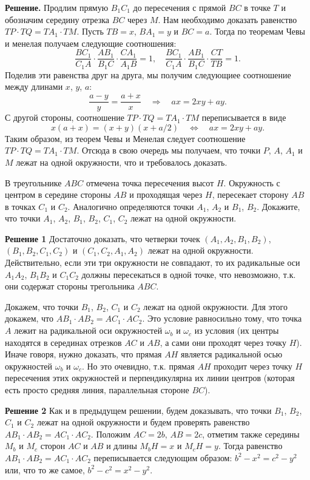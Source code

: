 \textbf{Решение.} Продлим прямую $B_1C_1$ до пересечения с прямой $BC$ в точке $T$ и обозначим середину отрезка $BC$ через $M$. Нам необходимо доказать равенство $TP\cdot TQ=TA_1\cdot TM$. Пусть $TB=x$, $BA_1=y$ и $BC=a$. Тогда по теоремам Чевы и менелая получаем следующие соотношения: $$\frac{BC_1}{C_1A}\cdot \frac{AB_1}{B_1C}\cdot\frac{CA_1}{A_1B}=1, \quad \frac{BC_1}{C_1A}\cdot\frac{AB_1}{B_1C}\cdot\frac{CT}{TB}=1.$$ Поделив эти равенства друг на друга, мы получим следующиее соотношение между длинами $x$, $y$, $a$: $$\frac{a-y}{y}=\frac{a+x}{x}\quad\Longrightarrow\quad ax=2xy+ay.$$ С другой стороны, соотношение $TP\cdot TQ=TA_1\cdot TM$ переписывается в виде $$x(a+x)=(x+y)(x+a/2)\quad\Longleftrightarrow\quad ax=2xy+ay.$$ Таким образом, из теорем Чевы и Менелая следует соотношение $TP\cdot TQ=TA_1\cdot TM$. Отсюда в свою очередь мы получаем, что точки $P$, $A$, $A_1$ и $M$ лежат на одной окружности, что и требовалось доказать.

 В треугольнике $ABC$ отмечена точка пересечения высот $H$. Окружность с центром в середине стороны $AB$ и проходящая через $H$, пересекает сторону $AB$ в точках $C_1$ и $C_2$. Аналогично определяются точки $A_1$, $A_2$ и $B_1$, $B_2$. Докажите, что точки $A_1$, $A_2$, $B_1$, $B_2$, $C_1$, $C_2$ лежат на одной окружности. 

\textbf{Решение 1} Достаточно доказать, что четверки точек $(A_1, A_2, B_1,B_2)$, $(B_1, B_2, C_1, C_2)$ и $(C_1, C_2, A_1,A_2)$ лежат на одной окружности. Действительно, если эти три окружности не совпадают, то их радикальные оси $A_1A_2$, $B_1B_2$ и $C_1C_2$ должны пересекаться в одной точке, что невозможно, т.к. они содержат стороны трегольника $ABC$.

Докажем, что точки $B_1$, $B_2$, $C_1$ и $C_2$ лежат на одной окружности. Для этого докажем, что $AB_1\cdot AB_2=AC_1\cdot AC_2$. Это условие равносильно тому, что точка $A$ лежит на радикальной оси окружностей $\omega_b$ и $\omega_c$ из условия (их центры находятся в серединах отрезков $AC$ и $AB$, а сами они проходят через точку $H$). Иначе говоря, нужно доказать, что прямая $AH$ является радикальной осью окружностей $\omega_b$ и $\omega_c$. Но это очевидно, т.к. прямая $AH$ проходит через точку $H$ пересечения этих окружностей и перпендикулярна их линии центров (которая есть просто средняя линия, параллельная стороне $BC$). 

\textbf{Решение 2} Как и в предыдущем решении, будем доказывать, что точки $B_1$, $B_2$, $C_1$ и $C_2$ лежат на одной окружности и будем проверять равенство $AB_1\cdot AB_2=AC_1\cdot AC_2$. Положим $AC=2b$, $AB=2c$, отметим также середины $M_b$ и $M_c$ сторон $AC$ и $AB$ и длины $M_bH=x$ и $M_cH=y$. Тогда равенство $AB_1\cdot AB_2=AC_1\cdot AC_2$ переписывается следующим образом: $b^2-x^2=c^2-y^2$ или, что то же самое, $b^2-c^2=x^2-y^2$. 

